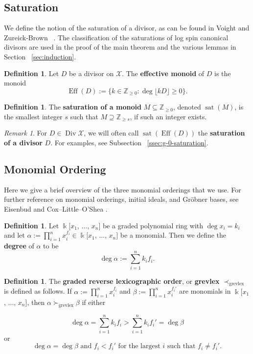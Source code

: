 \documentclass{amsart}
\theoremstyle{plain}
\theoremstyle{definition}
\newtheorem{defn}[thm]{Definition}
\theoremstyle{remark}
\newtheorem{rem}[thm]{Remark}
\numberwithin{equation}{section}
\newcommand\ssec{\subsection}
\newcommand\BZ{{\mathbb Z}}
\newcommand\Bk{{\Bbbk}}
\DeclareMathOperator\di{Div}
\newcommand\sx{\mathscr X}
\DeclareMathOperator{\Eff}{Eff}
\DeclareMathOperator{\sat}{sat}
\begin{document}
\ssec{Saturation}
We define the notion of the saturation of a divisor, as can be
found in Voight and Zureick-Brown ~\cite[Section 7.2]{vzb:stacky}.
The classification of the saturations of log spin canonical
divisors are used in the proof of the main theorem and the various
lemmas in Section ~\ref{sec:induction}.

\begin{defn}
Let $D$ be a divisor on $\sx$. The \textbf{effective monoid} of $D$
is the monoid
\[
	\Eff(D) := \{k \in \BZ_{\geq 0} : \deg \lfloor kD \rfloor \geq 0 \}.
\]
\end{defn}

\begin{defn}
\label{defn:sat}
The \textbf{saturation of a monoid} $M \subseteq \BZ_{\geq 0}$,
denoted $\sat(M)$, is the smallest integer $s$ such that $M
\supseteq \BZ_{\geq s}$, if such an integer exists.
\end{defn}

\begin{rem}
For $D \in \di \sx$, we will often call $\sat(\Eff(D))$ the
\textbf{saturation of a divisor} $D$. For examples,
see Subsection ~\ref{ssec:g-0-saturation}.
\end{rem}

\ssec{Monomial Ordering}
\label{ssec:monomial-order}
Here we give a brief overview of the three monomial orderings
that we use. For further reference on monomial orderings,
initial ideals, and Gr\"{o}bner bases, see Eisenbud
\cite[Section 15.9]{eisenbud:comm-alg} and Cox--Little--O'Shea
\cite[Chapter 2]{cls:ideals-varieties-algorithms}.

\begin{defn}
\label{defn:monomial-degree}
Let $\Bk[x_1$, $\ldots$, $x_n]$ be a graded polynomial
ring with $\deg x_i = k_i$ and let $\alpha := \prod_{i = 1}^{n} x_{i}^{f_i} \in
\Bk[x_{1}$, $\ldots$, $x_{n}]$ be a monomial. Then
we define the {\bf degree} of $\alpha$ to be
\[
	\deg \alpha := \sum_{i = 1}^{n} k_i f_i.
\]
\end{defn}

\begin{defn}
\label{defn:grevlex}
The {\bf graded reverse lexicographic order}, or {\bf grevlex} $\prec_{\text{grevlex}}$ is defined as follows.
If $\alpha := \prod_{i = 1}^{n} x_{i}
^{f_i}$ and $\beta := \prod_{i = 1}^{n} x_{i}^{f_i'}$ are
monomials in $\Bk[x_{1}$, $\ldots$, $x_{n}]$, then $\alpha
\succ_{\text{grevlex}} \beta$ if either

\begin{equation}
	\deg \alpha = \sum_{i = 1}^{n} k_i f_i  > \sum_{i = 1}^{n} k_i f_i' = \deg \beta
\end{equation}
or
\begin{equation}
\label{eqn:grevlex-tie}
	\deg \alpha = \deg \beta \text{ and }	f_i < f_i' \text{ for
	the	largest } i \text{ such that } f_i \neq f_i'.
\end{equation}
\end{defn}
\end{document}

